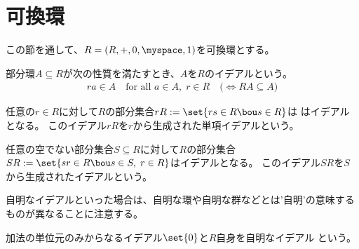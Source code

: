 {\section{可換環}\label{s1:可換環} %
	この節を通して、$R=(R,+,0,\myspace,1)$を可換環とする。

	\begin{definition}[可換環のイデアル]\label{def:可換環のイデアル} %
		部分環$A\subseteq R$が次の性質を満たすとき、$A$を$R$のイデアルという。
		\begin{equation*}\begin{split}
			ra\in A \quad\text{for all } a\in A,\; r\in R
			\quad\bigl(\iff RA\subseteq A \bigr)
		\end{split}\end{equation*}
	\end{definition} %

	\begin{definition}[単項イデアル]\label{def:単項イデアル} %
		任意の$r\in R$に対して$R$の部分集合$rR:=\set{rs\in R\bou s\in R}$は
		はイデアルとなる。
		このイデアル$rR$を$r$から生成された単項イデアルという。
	\end{definition} %

	\begin{definition}[部分集合から生成されたイデアル]
	\label{def:部分集合から生成されたイデアル} %
		任意の空でない部分集合$S\subseteq R$に対して$R$の部分集合
		$SR:=\set{sr\in R\bou s\in S,\; r\in R}$はイデアルとなる。
		このイデアル$SR$を$S$から生成されたイデアルという。
	\end{definition} %

	自明なイデアルといった場合は、自明な環や自明な群などとは'自明'の意味する
	ものが異なることに注意する。

	\begin{definition}[自明なイデアル]\label{def:自明なイデアル} %
		加法の単位元のみからなるイデアル$\set{0}$と$R$自身を自明なイデアル
		という。
	\end{definition} %

}
